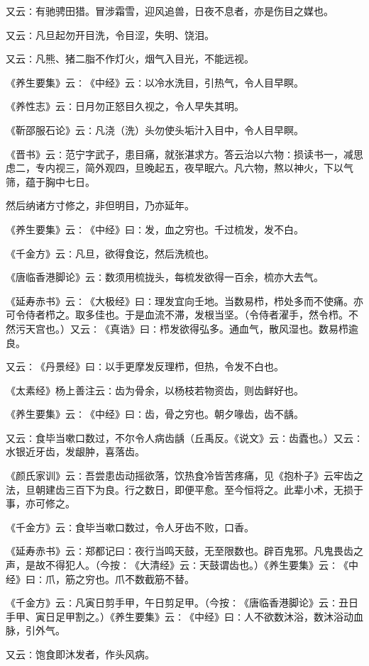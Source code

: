 \documentclass[a4paper,12pt,UTF8,twoside]{ctexbook}
\begin{document}
又云∶有驰骋田猎。冒涉霜雪，迎风追兽，日夜不息者，亦是伤目之媒也。

又云∶凡旦起勿开目洗，令目涩，失明、饶泪。

又云∶凡熊、猪二脂不作灯火，烟气入目光，不能远视。

《养生要集》云∶《中经》云∶以冷水洗目，引热气，令人目早瞑。

《养性志》云∶日月勿正怒目久视之，令人早失其明。

《靳邵服石论》云∶凡浇（洗）头勿使头垢汁入目中，令人目早瞑。

《晋书》云∶范宁字武子，患目痛，就张湛求方。答云治以六物∶损读书一，减思虑二，专内视三，简外观四，旦晚起五，夜早眠六。凡六物，熬以神火，下以气筛，蕴于胸中七日。

然后纳诸方寸修之，非但明目，乃亦延年。

《养生要集》云∶《中经》曰∶发，血之穷也。千过梳发，发不白。

《千金方》云∶凡旦，欲得食讫，然后洗梳也。

《唐临香港脚论》云∶数须用梳拢头，每梳发欲得一百余，梳亦大去气。

《延寿赤书》云∶《大极经》曰∶理发宜向壬地。当数易栉，栉处多而不使痛。亦可令侍者栉之。取多佳也。于是血流不滞，发根当坚。（令侍者濯手，然令栉。不然污天宫也。）又云∶《真诰》曰∶栉发欲得弘多。通血气，散风湿也。数易栉逾良。

又云∶《丹景经》曰∶以手更摩发反理栉，但热，令发不白也。

《太素经》杨上善注云∶齿为骨余，以杨枝若物资齿，则齿鲜好也。

《养生要集》云∶《中经》曰∶齿，骨之穷也。朝夕喙齿，齿不龋。

又云∶食毕当嗽口数过，不尔令人病齿龋（丘禹反。《说文》云∶齿蠹也。）又云∶水银近牙齿，发龈肿，喜落齿。

《颜氏家训》云∶吾尝患齿动摇欲落，饮热食冷皆苦疼痛，见《抱朴子》云牢齿之法，旦朝建齿三百下为良。行之数日，即便平愈。至今恒将之。此辈小术，无损于事，亦可修之。

《千金方》云∶食毕当嗽口数过，令人牙齿不败，口香。

《延寿赤书》云∶郑都记曰∶夜行当鸣天鼓，无至限数也。辟百鬼邪。凡鬼畏齿之声，是故不得犯人。（今按∶《大清经》云∶天鼓谓齿也。）《养生要集》云∶《中经》曰∶爪，筋之穷也。爪不数截筋不替。

《千金方》云∶凡寅日剪手甲，午日剪足甲。（今按∶《唐临香港脚论》云∶丑日手甲、寅日足甲割之。）《养生要集》云∶《中经》曰∶人不欲数沐浴，数沐浴动血脉，引外气。

又云∶饱食即沐发者，作头风病。
\end{document}
